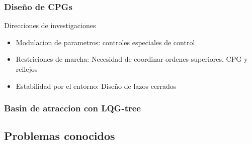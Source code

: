 \documentclass[10pt,onecolumn,twoside,letterpaper]{article}
\begin{document}
\subsubsection{Dise\~no de CPGs}
Direcciones de investigaciones\cite{Wu2009}
\begin{itemize}
\item Modulacion de parametros: controles especiales de control
\item Restriciones de marcha: Necesidad de coordinar ordenes superiores, CPG y reflejos
\item Estabilidad por el entorno: Dise\~no de lazos cerrados
\end{itemize}
\href{run:/home/jackmaster/Downloads/[2009 Wu QiDi and Liu ChengJu and Zhang JiaQi and Chen QiJun] Art Survey of locomotion control of legged robots inspired biological concept.pdf}{
}\cite{Wu2009}
\subsubsection{Basin de atraccion con LQG-tree}
\subsection{Problemas conocidos}
\end{document}
